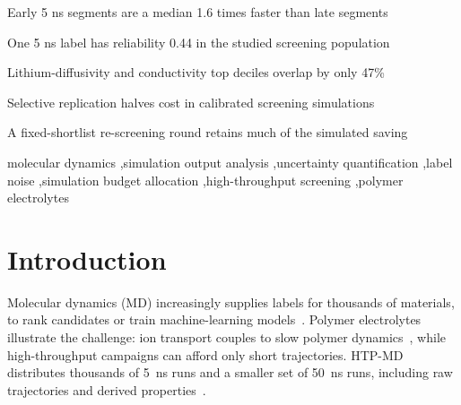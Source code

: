 \documentclass[preprint,12pt]{elsarticle}
\begin{document}
\begin{frontmatter}
\begin{highlights}
\item Early 5 ns segments are a median 1.6 times faster than late segments
\item One 5 ns label has reliability 0.44 in the studied screening population
\item Lithium-diffusivity and conductivity top deciles overlap by only 47\%
\item Selective replication halves cost in calibrated screening simulations
\item A fixed-shortlist re-screening round retains much of the simulated saving
\end{highlights}

\begin{keyword}
molecular dynamics \sep simulation output analysis \sep uncertainty quantification \sep label
noise \sep simulation budget allocation \sep high-throughput screening \sep polymer electrolytes
\end{keyword}

\end{frontmatter}

\section{Introduction}\label{sec:intro}
Molecular dynamics (MD) increasingly supplies labels for thousands of materials, to rank
candidates or train machine-learning models~\cite{Xie2022Accelerating}. Polymer electrolytes
illustrate the challenge: ion transport couples to slow polymer dynamics~\cite{Borodin2006PEO,Webb2015Polyester},
while high-throughput campaigns can afford only short trajectories. HTP-MD distributes thousands
of \SI{5}{\nano\second} runs and a smaller set of \SI{50}{\nano\second} runs, including raw
trajectories and derived properties~\cite{Xie2022Accelerating,Xie2023HTPMD}.
\end{document}
